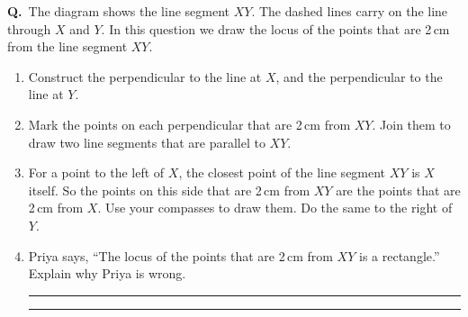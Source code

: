 \documentclass[12pt,a4paper]{article}
\newcounter{qn}
\newcommand{\q}{\refstepcounter{qn}\textbf{Q\theqn.}\ }
\newcommand{\wline}{\par\vspace{16pt}\noindent\rule{\linewidth}{0.4pt}}
\newcommand{\pt}[3]{\fill #1 circle (1.5pt); \node[lab,#2] at #1 {$#3$};}
\newenvironment{diagram}{\par\vspace{8pt}\centering}{\par}
\begin{document}
\vfill

\q The diagram shows the line segment $XY$. The dashed lines carry on
the line through $X$ and $Y$. In this question we draw the locus of
the points that are 2\,cm from the line segment $XY$.
\begin{enumerate}
  \item Construct the perpendicular to the line at $X$, and the
    perpendicular to the line at $Y$.
  \item Mark the points on each perpendicular that are 2\,cm from $XY$.
    Join them to draw two line segments that are parallel to $XY$.
  \item For a point to the left of $X$, the closest point of the line
    segment $XY$ is $X$ itself. So the points on this side that are
    2\,cm from $XY$ are the points that are 2\,cm from $X$. Use your
    compasses to draw them. Do the same to the right of $Y$.
  \item Priya says, ``The locus of the points that are 2\,cm from $XY$
    is a rectangle.'' Explain why Priya is wrong.
    \wline
    \wline
\end{enumerate}

\begin{diagram}
\end{diagram}

\vfill
\newpage

\end{document}
